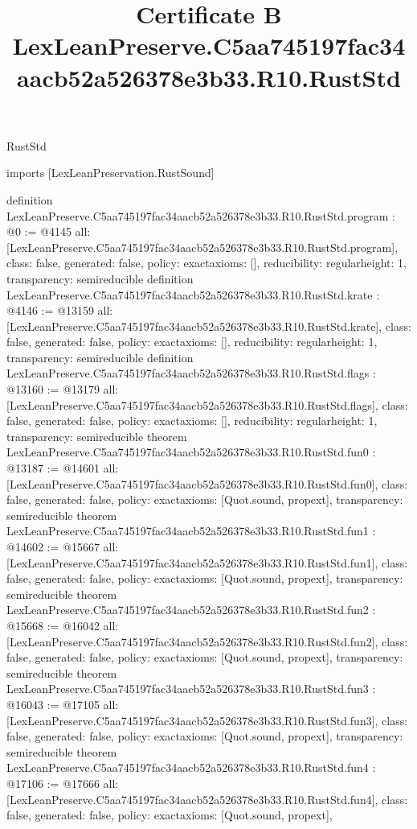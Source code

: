 \begin{lexlean}{RustStd}
\title{Certificate B LexLeanPreserve.C5aa745197fac34aacb52a526378e3b33.R10.RustStd}
\begin{coremodule}
imports [LexLeanPreservation.RustSound]

definition LexLeanPreserve.C5aa745197fac34aacb52a526378e3b33.R10.RustStd.program : @0 := @4145 {
  all: [LexLeanPreserve.C5aa745197fac34aacb52a526378e3b33.R10.RustStd.program],
  class: false,
  generated: false,
  policy: exact{axioms: []},
  reducibility: regular{height: 1},
  transparency: semireducible
}
definition LexLeanPreserve.C5aa745197fac34aacb52a526378e3b33.R10.RustStd.krate : @4146 := @13159 {
  all: [LexLeanPreserve.C5aa745197fac34aacb52a526378e3b33.R10.RustStd.krate],
  class: false,
  generated: false,
  policy: exact{axioms: []},
  reducibility: regular{height: 1},
  transparency: semireducible
}
definition LexLeanPreserve.C5aa745197fac34aacb52a526378e3b33.R10.RustStd.flags : @13160 := @13179 {
  all: [LexLeanPreserve.C5aa745197fac34aacb52a526378e3b33.R10.RustStd.flags],
  class: false,
  generated: false,
  policy: exact{axioms: []},
  reducibility: regular{height: 1},
  transparency: semireducible
}
theorem LexLeanPreserve.C5aa745197fac34aacb52a526378e3b33.R10.RustStd.fun0 : @13187 := @14601 {
  all: [LexLeanPreserve.C5aa745197fac34aacb52a526378e3b33.R10.RustStd.fun0],
  class: false,
  generated: false,
  policy: exact{axioms: [Quot.sound, propext]},
  transparency: semireducible
}
theorem LexLeanPreserve.C5aa745197fac34aacb52a526378e3b33.R10.RustStd.fun1 : @14602 := @15667 {
  all: [LexLeanPreserve.C5aa745197fac34aacb52a526378e3b33.R10.RustStd.fun1],
  class: false,
  generated: false,
  policy: exact{axioms: [Quot.sound, propext]},
  transparency: semireducible
}
theorem LexLeanPreserve.C5aa745197fac34aacb52a526378e3b33.R10.RustStd.fun2 : @15668 := @16042 {
  all: [LexLeanPreserve.C5aa745197fac34aacb52a526378e3b33.R10.RustStd.fun2],
  class: false,
  generated: false,
  policy: exact{axioms: [Quot.sound, propext]},
  transparency: semireducible
}
theorem LexLeanPreserve.C5aa745197fac34aacb52a526378e3b33.R10.RustStd.fun3 : @16043 := @17105 {
  all: [LexLeanPreserve.C5aa745197fac34aacb52a526378e3b33.R10.RustStd.fun3],
  class: false,
  generated: false,
  policy: exact{axioms: [Quot.sound, propext]},
  transparency: semireducible
}
theorem LexLeanPreserve.C5aa745197fac34aacb52a526378e3b33.R10.RustStd.fun4 : @17106 := @17666 {
  all: [LexLeanPreserve.C5aa745197fac34aacb52a526378e3b33.R10.RustStd.fun4],
  class: false,
  generated: false,
  policy: exact{axioms: [Quot.sound, propext]},
}
\end{coremodule}
\end{lexlean}
